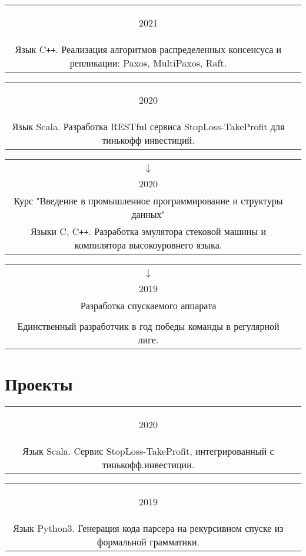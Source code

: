 \documentclass{article}
\newcommand{\entry}[3]{
	\begin{tabular}{ c | c }
    \begin{minipage}{0.05\linewidth}
    	\begin{center}
    		#1
    	\end{center}
    \end{minipage} 
    &
    \begin{minipage}{0.85\linewidth}
        \textbf{#2} \\ \footnotesize{#3}
    \end{minipage}
    \end{tabular}
}
\newcommand{\interval}[2]{
	#1 \\ $\downarrow$ \\ #2
}
\begin{document}
    \vspace{.1cm}
    
    \entry {2021
        }
        {МФТИ - Распределенные системы }
        { Язык C\texttt{++}. Реализация алгоритмов распределенных консенсуса и репликации: Paxos, MultiPaxos, Raft.  }
    
    \vspace{.1cm}
    
    \entry {2020
        }
        {Тинькофф Финтех - Курс разработки на Scala }
        { Язык Scala. Разработка RESTful сервиса StopLoss-TakeProfit для тинькофф инвестиций. }
    
    \vspace{.1cm}
    
    \entry {\interval{2019}{2020}
    }
    {Технотрек Mail.ru Group - \\
    Курс "Введение в промышленное программирование и структуры данных"}
    { Языки C, C\texttt{++}. Разработка эмулятора стековой машины и компилятора высокоуровнего языка. }
    
    \vspace{.1cm}  

    \entry {\interval{2017}{2019}
    }
    {Воздушно-инженерная школа Cansat в России - \\
    Разработка спускаемого аппарата}
    { Язык C для AVR и STM32. Ведущий разработчик в команде. \\ Единственный разработчик в год победы команды в регулярной лиге. } 
    
    \vspace{.1cm}
     
    \section{Проекты}
        
    \entry {2020}
    {\href {https://gitlab.com/Inversion/gainy}{gainy} - Сервис с HTTP RESTful API}
    { Язык Scala. Cервис StopLoss-TakeProfit, интегрированный с тинькофф.инвестиции. } 
    
    \vspace{.1cm}
        
    \entry {2019}
    {\href {https://github.com/InversionSpaces/PEGgen}{PEGgen} - Утилита комнадной строки}
    { Язык Python3. Генерация кода парсера на рекурсивном спуске из формальной грамматики.} 
    
\end{document}
